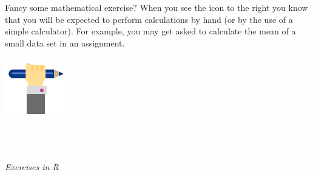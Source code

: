 \begin{minipage}{0.85\textwidth}
Fancy some mathematical exercise? When you see the icon to the right you know that you will be expected to perform calculations by hand (or by the use of a simple calculator). For example, you may get asked to calculate the mean of a small data set in an assignment.
\end{minipage}%
\hfill%
\begin{minipage}{0.1\textwidth}
\includegraphics[width=\linewidth]{Files/Images/pencilhand.pdf}
\end{minipage} \\
\\
\bigskip

\textit{Exercises in R} \\ 

